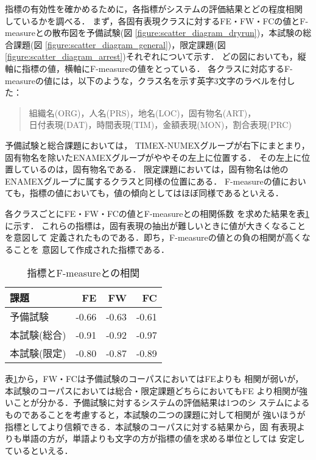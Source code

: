 指標の有効性を確かめるために，各指標がシステムの評価結果とどの程度相関
しているかを調べる．
まず，各固有表現クラスに対するFE・FW・FCの値とF-measureとの散布図を予備試験(図
\ref{figure:scatter_diagram_dryrun})，本試験の総合課題(図
\ref{figure:scatter_diagram_general})，限定課題(図
\ref{figure:scatter_diagram_arrest})それぞれについて示す．
どの図においても，縦軸に指標の値，横軸にF-measureの値をとっている．
各クラスに対応するF-measureの値には，以下のような，クラス名を示す英字3文字のラベルを付した：
\begin{quote}
組織名(ORG)，人名(PRS)，地名(LOC)，固有物名(ART)，\\
日付表現(DAT)，時間表現(TIM)，金額表現(MON)，割合表現(PRC)
\end{quote}

予備試験と総合課題においては，
TIMEX-NUMEXグループが右下にまとまり，固有物名を除いたENAMEXグループがややその左上に位置する．
その左上に位置しているのは，固有物名である．
限定課題においては，固有物名は他のENAMEXグループに属するクラスと同様の位置にある．
F-measureの値においても，指標の値においても，値の傾向としてはほぼ同様であるといえる．

各クラスごとにFE・FW・FCの値とF-measureとの相関係数
を求めた結果を表\ref{table:FEWC_CC}に示す．
これらの指標は，固有表現の抽出が難しいときに値が大きくなることを意図して
定義されたものである．即ち，F-measureの値との負の相関が高くなることを
意図して作成された指標である．

\begin{table}[t]\small
\caption{\label{table:FEWC_CC}指標とF-measureとの相関}
\begin{center}
\begin{tabular}{|l||r|r|r|} \hline
課題         &    FE &    FW &    FC \\ \hline \hline
予備試験     & -0.66 & -0.63 & -0.61 \\ \hline	     	             
本試験(総合) & -0.91 & -0.92 & -0.97 \\ \hline	     	             
本試験(限定) & -0.80 & -0.87 & -0.89 \\ \hline
\end{tabular}
\end{center}
\end{table}

表\ref{table:FEWC_CC}から，FW・FCは予備試験のコーパスにおいてはFEよりも
相関が弱いが，本試験のコーパスにおいては総合・限定課題どちらにおいてもFE
より相関が強いことが分かる．予備試験に対するシステムの評価結果は1つのシ
ステムによるものであることを考慮すると，本試験の二つの課題に対して相関が
強いほうが指標としてより信頼できる．本試験のコーパスに対する結果から，固
有表現よりも単語の方が，単語よりも文字の方が指標の値を求める単位としては
安定しているといえる．

